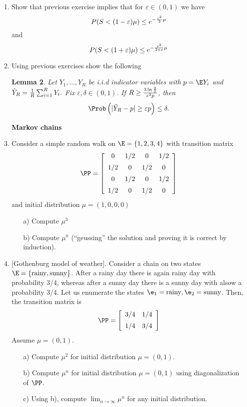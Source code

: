 \documentclass[a4paper,12pt]{article}
\newtheorem{lem}{Lemma}
\begin{document}
\begin{enumerate}
\begin{lem}[Chernoff  inequality ]
 
\end{lem}

\item Show that previous exercise implies that for $\varepsilon\in(0,1)$ we have
$$P(S<(1-\varepsilon)\mu)\leq e^{-{\varepsilon^2\over 2}\mu}$$
and
$$P(S<(1+\varepsilon)\mu)\leq e^{-{\varepsilon^2\over 2+\varepsilon}\mu}$$

\item Using previous exercises show the following

\begin{lem}   Let $Y_1,\ldots,Y_R$ be i.i.d indicator variables with $p=\E Y_i$ and $\hat{Y}_R={1\over R}\sum_{i=1}^R Y_i.$
Fix   $\varepsilon, \delta\in(0,1)$. If  $R\geq{3\ln{2\over \delta}\over \varepsilon^2 p}$,
then
$$\Prob\left(|\hat{Y}_R-p|\geq \varepsilon p\right)\leq \delta.$$
\end{lem}





\bigskip\par 
\textbf{Markov chains}

 
\item\label{zad_wyk} Consider a simple random walk on 
$\E=\{1,2,3,4\}$ with transition matrix 
$$\PP=\left[
\begin{array}{cccc}
     0 & 1/2 & 0 & 1/2  \\[5pt]
      1/2 & 0 & 1/2 & 0  \\[5pt]
     0 & 1/2 & 0 & 1/2  \\[5pt]
      1/2 & 0 & 1/2 & 0  \\
    \end{array}\right]
$$ and initial distribution $\mu=(1,0,0,0)$

\begin{itemize}
 \item[a)] Compute $\mu^3$
 \item[b)] Compute $\mu^n$ (``geussing'' the solution and proving it is correct by induction).
\end{itemize}

 \item\label{zad_gothenburg}[Gothenburg model of weather]. 
 Consider a chain on two states $\E=\{\textrm{rainy},\textrm{sunny}\}$.
 After a rainy day there is again rainy day with probability 3/4, whereas after a sunny day 
 there is a sunny day with alsow a probability 3/4. 
 Let us enumerate the states $\e_1=\textrm{rainy}, \e_2=\textrm{sunny}$. Then, the transition matrix is
$$\PP=\left[
\begin{array}{cc}
     {3/4} & {1/ 4} \\[5pt]
{1/ 4} & {3/ 4}
    \end{array}\right]
$$
Assume  $\mu=(0,1)$.
\begin{itemize}
 \item[a)] Compute $\mu^2$ for initial distribution  $\mu=(0,1)$.
 \item[b)] Compute $\mu^n$ for initial distribution  $\mu=(0,1)$ using diagonalization of $\PP$.
 \item[c)] Using b), compute $\lim_{n\to\infty}\mu^n$ for any initial distribution.
\end{itemize}
 

\end{enumerate}
\end{document}

